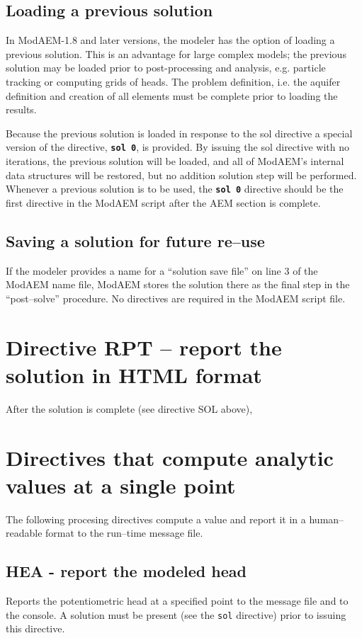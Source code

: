 \subsection{Loading a previous solution}

In ModAEM-1.8 and later versions, the modeler has the option of loading a 
previous solution. This is an advantage for large complex models; the previous
solution may be loaded prior to post-processing and analysis, e.g. particle
tracking or computing grids of heads. The problem definition, i.e.
the aquifer definition and creation of all elements must be complete
prior to loading the results. 

Because the previous solution is loaded in response to the \textsf{sol}
directive a special version of the directive, \texttt{\textbf{sol
0}}, is provided. By issuing the \textsf{sol} directive with no iterations,
the previous solution will be loaded, and all of ModAEM's internal
data structures will be restored, but no addition solution step will
be performed. Whenever a previous solution is to be used, the \texttt{\textbf{sol
0}} directive should be the first directive in the ModAEM script after
the AEM section is complete.

\subsection{Saving a solution for future re--use}

If the modeler provides a name for a ``solution save file'' on line
3 of the ModAEM name file, ModAEM stores the solution there as the
final step in the ``post--solve'' procedure. No directives are required
in the ModAEM script file.

\section{Directive RPT -- report the solution in HTML format}

After the solution is complete (see directive \textsf{SOL} above), 

\section{Directives that compute analytic values at a single point}

The following procesing directives compute a value and report it in
a human--readable format to the run--time message file.

\subsection{\label{HEA_directive}HEA - report the modeled head}
Reports the potentiometric head at a specified point to the message
file and to the console. A solution must be present (see the \texttt{sol}
directive) prior to issuing this directive. 


